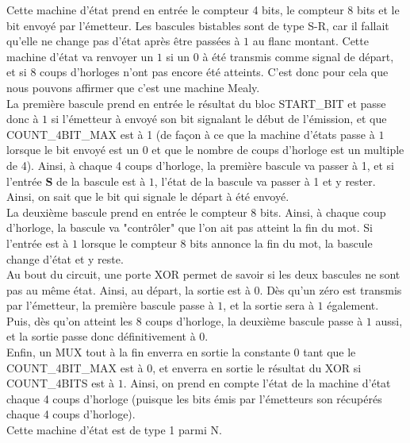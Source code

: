 \documentclass[a4paper]{article} %
\begin{document}
\begin{tcolorbox}[colframe=Monokaimagenta,colback=white]
Cette machine d'état prend en entrée le compteur 4 bits, le compteur 8 bits et le bit envoyé par l'émetteur. Les bascules bistables sont de type S-R, car il fallait qu'elle ne change pas d'état après être passées à $1$ au flanc montant. Cette machine d'état va renvoyer un $1$ si un $0$ à été transmis comme signal de départ, et si 8 coups d'horloges n'ont pas encore été atteints. C'est donc pour cela que nous pouvons affirmer que c'est une machine Mealy.\\
La première bascule prend en entrée le résultat du bloc START\_BIT et passe donc à $1$ si l'émetteur à envoyé son bit signalant le début de l'émission, et que COUNT\_4BIT\_MAX est à 1 (de façon à ce que la machine d'états passe à $1$ lorsque le bit envoyé est un $0$ et que le nombre de coups d'horloge est un multiple de 4). Ainsi, à chaque 4 coups d'horloge, la première bascule va passer à 1, et si l'entrée \textbf{S} de la bascule est à $1$, l'état de la bascule va passer à 1 et y rester. Ainsi, on sait que le bit qui signale le départ à été envoyé.\\
La deuxième bascule prend en entrée le compteur 8 bits. Ainsi, à chaque coup d'horloge, la bascule va "contrôler" que l'on ait pas atteint la fin du mot. Si l'entrée est à $1$ lorsque le compteur 8 bits annonce la fin du mot, la bascule change d'état et y reste.\\
Au bout du circuit, une porte XOR permet de savoir si les deux bascules ne sont pas au même état.
Ainsi, au départ, la sortie est à 0. Dès qu'un zéro est transmis par l'émetteur, la première bascule passe à $1$, et la sortie sera à $1$ également. Puis, dès qu'on atteint les 8 coups d'horloge, la deuxième bascule passe à $1$ aussi, et la sortie passe donc définitivement à $0$.\\
Enfin, un MUX tout à la fin enverra en sortie la constante $0$ tant que le COUNT\_4BIT\_MAX est à $0$, et enverra en sortie le résultat du XOR si COUNT\_4BITS est à $1$. Ainsi, on prend en compte l'état de la machine d'état chaque 4 coups d'horloge (puisque les bits émis par l'émetteurs son récupérés chaque 4 coups d'horloge).\\
Cette machine d'état est de type 1 parmi N.
\end{tcolorbox}
\end{document}
